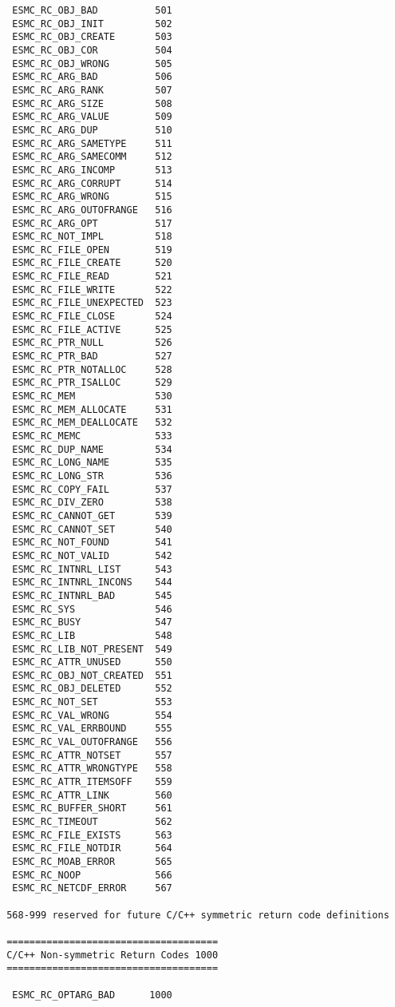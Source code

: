 \begin{verbatim}
  ESMC_RC_OBJ_BAD          501
  ESMC_RC_OBJ_INIT         502
  ESMC_RC_OBJ_CREATE       503
  ESMC_RC_OBJ_COR          504
  ESMC_RC_OBJ_WRONG        505
  ESMC_RC_ARG_BAD          506
  ESMC_RC_ARG_RANK         507
  ESMC_RC_ARG_SIZE         508
  ESMC_RC_ARG_VALUE        509
  ESMC_RC_ARG_DUP          510
  ESMC_RC_ARG_SAMETYPE     511
  ESMC_RC_ARG_SAMECOMM     512
  ESMC_RC_ARG_INCOMP       513
  ESMC_RC_ARG_CORRUPT      514
  ESMC_RC_ARG_WRONG        515
  ESMC_RC_ARG_OUTOFRANGE   516
  ESMC_RC_ARG_OPT          517
  ESMC_RC_NOT_IMPL         518
  ESMC_RC_FILE_OPEN        519
  ESMC_RC_FILE_CREATE      520
  ESMC_RC_FILE_READ        521
  ESMC_RC_FILE_WRITE       522
  ESMC_RC_FILE_UNEXPECTED  523
  ESMC_RC_FILE_CLOSE       524
  ESMC_RC_FILE_ACTIVE      525
  ESMC_RC_PTR_NULL         526
  ESMC_RC_PTR_BAD          527
  ESMC_RC_PTR_NOTALLOC     528
  ESMC_RC_PTR_ISALLOC      529
  ESMC_RC_MEM              530
  ESMC_RC_MEM_ALLOCATE     531
  ESMC_RC_MEM_DEALLOCATE   532
  ESMC_RC_MEMC             533
  ESMC_RC_DUP_NAME         534
  ESMC_RC_LONG_NAME        535
  ESMC_RC_LONG_STR         536
  ESMC_RC_COPY_FAIL        537
  ESMC_RC_DIV_ZERO         538
  ESMC_RC_CANNOT_GET       539
  ESMC_RC_CANNOT_SET       540
  ESMC_RC_NOT_FOUND        541
  ESMC_RC_NOT_VALID        542
  ESMC_RC_INTNRL_LIST      543
  ESMC_RC_INTNRL_INCONS    544
  ESMC_RC_INTNRL_BAD       545
  ESMC_RC_SYS              546
  ESMC_RC_BUSY             547
  ESMC_RC_LIB              548
  ESMC_RC_LIB_NOT_PRESENT  549
  ESMC_RC_ATTR_UNUSED      550
  ESMC_RC_OBJ_NOT_CREATED  551
  ESMC_RC_OBJ_DELETED      552
  ESMC_RC_NOT_SET          553
  ESMC_RC_VAL_WRONG        554
  ESMC_RC_VAL_ERRBOUND     555
  ESMC_RC_VAL_OUTOFRANGE   556
  ESMC_RC_ATTR_NOTSET      557
  ESMC_RC_ATTR_WRONGTYPE   558
  ESMC_RC_ATTR_ITEMSOFF    559
  ESMC_RC_ATTR_LINK        560
  ESMC_RC_BUFFER_SHORT     561
  ESMC_RC_TIMEOUT          562
  ESMC_RC_FILE_EXISTS      563
  ESMC_RC_FILE_NOTDIR      564
  ESMC_RC_MOAB_ERROR       565
  ESMC_RC_NOOP             566
  ESMC_RC_NETCDF_ERROR     567
 
 568-999 reserved for future C/C++ symmetric return code definitions
 
 =====================================
 C/C++ Non-symmetric Return Codes 1000
 =====================================
 
  ESMC_RC_OPTARG_BAD      1000
 
 \end{verbatim}
\setlength{\parskip}{\oldparskip}
\setlength{\parindent}{\oldparindent}
\setlength{\baselineskip}{\oldbaselineskip}
